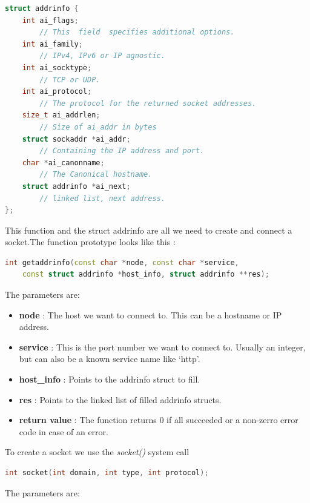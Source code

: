 \documentclass{article}
\begin{document}
				\begin{lstlisting}[language=C++, caption={The structure ``addrinfo''}]
struct addrinfo {
    int ai_flags;     
    	// This  field  specifies additional options.
    int ai_family;    
    	// IPv4, IPv6 or IP agnostic.
    int ai_socktype;  
    	// TCP or UDP.
    int ai_protocol;  
    	// The protocol for the returned socket addresses.
    size_t ai_addrlen;   
    	// Size of ai_addr in bytes
    struct sockaddr *ai_addr;      
    	// Containing the IP address and port.
    char *ai_canonname; 
    	// The Canonical hostname.
    struct addrinfo *ai_next;      
    	// linked list, next address.
};
				\end{lstlisting}

				This function and the struct addrinfo are all we need to create and connect a socket.The function prototype looks like this : 

				\begin{lstlisting}[language=C++, caption={getaddrinfo() function}]
int getaddrinfo(const char *node, const char *service,
	const struct addrinfo *host_info, struct addrinfo **res); 
				\end{lstlisting}

				The parameters are:

				\begin{itemize}
					\item \textbf{node} : The host we want to connect to. This can be a hostname or IP address. 
					\item \textbf{service} : This is the port number we want to connect to. Usually an integer, but can also be a known service name like `http'. 					
					\item \textbf{host\_info} : Points to the addrinfo struct to fill. 					
					\item \textbf{res} : Points to the linked list of filled addrinfo structs. 
					\item \textbf{return value} : The function returns 0 if all succeeded or a non-zerro error code in case of an error.  
				\end{itemize}
				
				To create a socket we use the \textit{socket()} system call 

				\begin{lstlisting}[language=C++, caption={socket() function}]
int socket(int domain, int type, int protocol); 
				\end{lstlisting} 	

				The parameters are:
\end{document}
